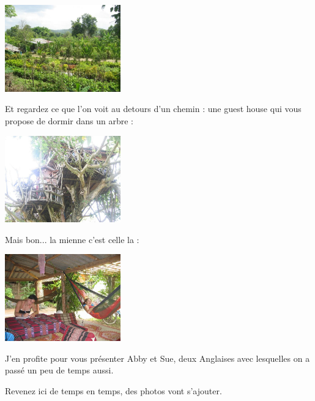 \begin{multicols}{2}
\smallbreak
\hspace*{-0.65cm}
\includegraphics[width=5cm]{articles/Pai/1214286138yJBp.jpg}
\smallbreak

Et regardez ce que l'on voit au detours d'un chemin : une guest house qui vous propose de dormir dans un arbre :

\smallbreak
\hspace*{-0.65cm}
\includegraphics[width=5cm]{articles/Pai/1214471897bdDK.jpg}
\smallbreak

Mais bon... la mienne c'est celle la :

\smallbreak
\hspace*{-0.65cm}
\includegraphics[width=5cm]{articles/Pai/1214471886LoCS.jpg}
\smallbreak

J'en profite pour vous présenter Abby et Sue, deux Anglaises avec lesquelles on a passé un peu de temps aussi.

Revenez ici de temps en temps, des photos vont s'ajouter.

\end{multicols}


